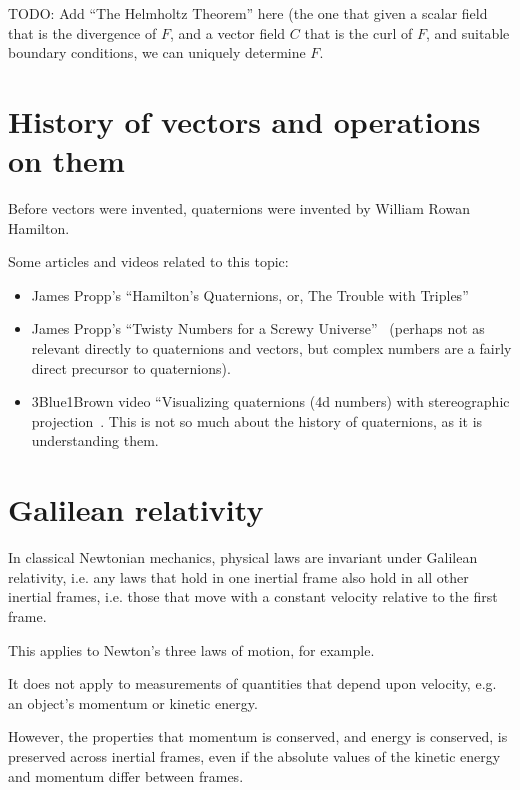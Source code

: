 \documentclass[a4paper]{article}
\theoremstyle{plain}
\theoremstyle{definition}
\begin{document}
TODO: Add ``The Helmholtz Theorem'' here (the one that given a scalar
field that is the divergence of $F$, and a vector field $C$ that is
the curl of $F$, and suitable boundary conditions, we can uniquely
determine $F$.


\section{History of vectors and operations on them}

Before vectors were invented, quaternions were invented by William
Rowan Hamilton.

Some articles and videos related to this topic:

\begin{itemize}

\item James Propp's ``Hamilton's Quaternions, or, The Trouble with
  Triples''~\cite{HamiltonsQuaternions}

\item James Propp's ``Twisty Numbers for a Screwy
  Universe''~\cite{TwistyNumbers} (perhaps not as relevant directly to
  quaternions and vectors, but complex numbers are a fairly direct
  precursor to quaternions).

\item 3Blue1Brown video ``Visualizing quaternions (4d numbers) with
  stereographic projection~\cite{VisualizingQuaternions}.  This is not
  so much about the history of quaternions, as it is understanding
  them.

\end{itemize}


\section{Galilean relativity}

In classical Newtonian mechanics, physical laws are invariant under
Galilean relativity, i.e. any laws that hold in one inertial frame
also hold in all other inertial frames, i.e. those that move with a
constant velocity relative to the first frame.

This applies to Newton's three laws of motion, for example.

It does not apply to measurements of quantities that depend upon
velocity, e.g. an object's momentum or kinetic energy.

However, the properties that momentum is conserved, and energy is
conserved, is preserved across inertial frames, even if the absolute
values of the kinetic energy and momentum differ between frames.
\end{document}
